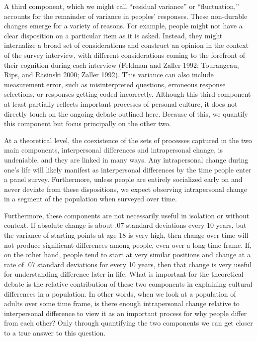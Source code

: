 \documentclass[
  12pt,
]{article}
\begin{document}
A third component, which we might call ``residual variance'' or
``fluctuation,'' accounts for the remainder of variance in peoples'
responses. These non-durable changes emerge for a variety of reasons.
For example, people might not have a clear disposition on a particular
item as it is asked. Instead, they might internalize a broad set of
considerations and construct an opinion in the context of the survey
interview, with different considerations coming to the forefront of
their cognition during each interview (Feldman and Zaller 1992;
Tourangeau, Rips, and Rasinski 2000; Zaller 1992). This variance can
also include measurement error, such as misinterpreted questions,
erroneous response selections, or responses getting coded incorrectly.
Although this third component at least partially reflects important
processes of personal culture, it does not directly touch on the ongoing
debate outlined here. Because of this, we quantify this component but
focus principally on the other two.

At a theoretical level, the coexistence of the sets of processes
captured in the two main components, interpersonal differences and
intrapersonal change, is undeniable, and they are linked in many ways.
Any intrapersonal change during one's life will likely manifest as
interpersonal differences by the time people enter a panel survey.
Furthermore, unless people are entirely socialized early on and never
deviate from these dispositions, we expect observing intrapersonal
change in a segment of the population when surveyed over time.

Furthermore, these components are not necessarily useful in isolation or
without context. If absolute change is about .07 standard deviations
every 10 years, but the variance of starting points at age 18 is very
high, then change over time will not produce significant differences
among people, even over a long time frame. If, on the other hand, people
tend to start at very similar positions and change at a rate of .07
standard deviations for every 10 years, then that change is very useful
for understanding difference later in life. What is important for the
theoretical debate is the relative contribution of these two components
in explaining cultural differences in a population. In other words, when
we look at a population of adults over some time frame, is there enough
intrapersonal change relative to interpersonal difference to view it as
an important process for why people differ from each other? Only through
quantifying the two components we can get closer to a true answer to
this question.
\end{document}
